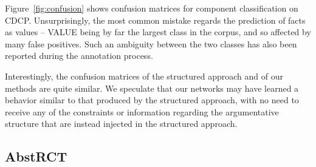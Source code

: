 \documentclass[journal]{IEEEtran}
\begin{document}
Figure~\ref{fig:confusion} shows confusion matrices for component classification on CDCP. Unsurprisingly, the most common mistake regards the prediction of facts as values -- VALUE being by far the largest class in the corpus, and so affected by many false positives. Such an ambiguity between the two classes has also been reported during the annotation process.

Interestingly, the confusion matrices of the structured approach and of our methods are quite similar. We speculate that our networks may have learned a behavior similar to that produced by the structured approach, with no need to receive any of the constraints or information regarding the argumentative structure that are instead injected in the structured approach.


\subsection{AbstRCT}
\end{document}
